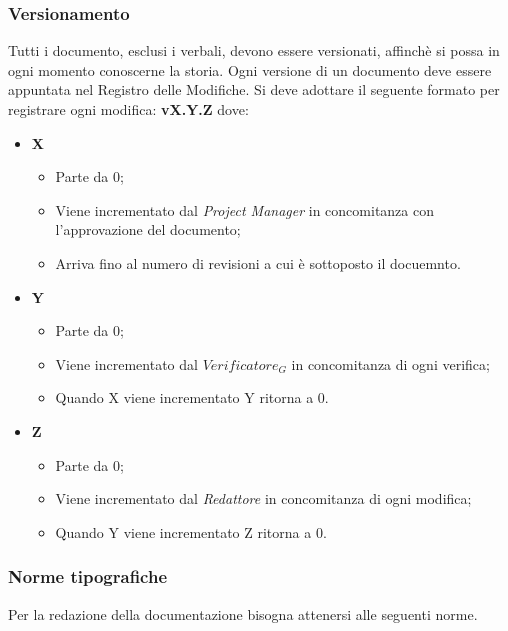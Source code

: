 	\subsubsection{Versionamento}
	\label{versionamento}
	Tutti i documento, esclusi i verbali, devono essere versionati, affinchè si possa in ogni momento conoscerne la storia. Ogni versione di un documento deve essere appuntata nel Registro delle Modifiche. Si deve adottare il seguente formato per registrare ogni modifica: 
	\textbf{v{X}.{Y}.{Z}}
	dove:
	\begin{itemize}
		\item \textbf{X}
		\begin{itemize}
			\item Parte da 0;
			\item Viene incrementato dal \textit{Project Manager} in concomitanza con l'approvazione del documento;
			\item Arriva fino al numero di revisioni a cui è sottoposto il docuemnto.
		\end{itemize}
		
		\item \textbf{Y}
		\begin{itemize}
			\item Parte da 0;
			\item Viene incrementato dal \textit{$Verificatore_G$} in concomitanza di ogni verifica;
			\item Quando X viene incrementato Y ritorna a 0.
		\end{itemize}
		
		\item \textbf{Z}
		\begin{itemize}
			\item Parte da 0;
			\item Viene incrementato dal \textit{Redattore} in concomitanza di ogni modifica;
			\item Quando Y viene incrementato Z	 ritorna a 0.
		\end{itemize}
		
	\end{itemize}
	
	\subsubsection{Norme tipografiche} 
	Per la redazione della documentazione bisogna attenersi alle seguenti norme.
		
